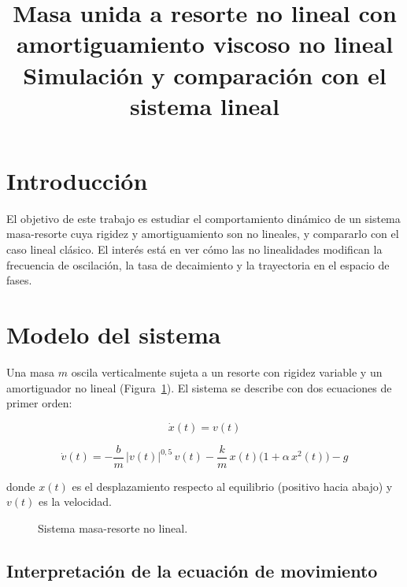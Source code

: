 \documentclass[12pt, a4paper]{article}
\title{
    \Large \textbf{Masa unida a resorte no lineal con amortiguamiento viscoso no lineal} \\[0.5cm]
    \large Simulación y comparación con el sistema lineal
}
\author{}
\date{}
\begin{document}
\maketitle
\tableofcontents
\newpage

\section{Introducción}

El objetivo de este trabajo es estudiar el comportamiento dinámico de un sistema masa-resorte cuya rigidez y amortiguamiento son no lineales, y compararlo con el caso lineal clásico. El interés está en ver cómo las no linealidades modifican la frecuencia de oscilación, la tasa de decaimiento y la trayectoria en el espacio de fases.

\section{Modelo del sistema}

Una masa $m$ oscila verticalmente sujeta a un resorte con rigidez variable y un amortiguador no lineal (Figura~\ref{fig:sistema}). El sistema se describe con dos ecuaciones de primer orden:

\begin{equation}
    \dot{x}(t) = v(t)
\end{equation}

\begin{equation}
    \dot{v}(t) = -\frac{b}{m}\,|v(t)|^{0{,}5}\,v(t)
                 - \frac{k}{m}\,x(t)\bigl(1 + \alpha\,x^2(t)\bigr) - g
    \label{eq:vdot}
\end{equation}

donde $x(t)$ es el desplazamiento respecto al equilibrio (positivo hacia abajo) y $v(t)$ es la velocidad.

\begin{figure}[H]
    \centering
    \fbox{\rule{0pt}{4cm}\rule{5cm}{0pt}}
    \caption{Sistema masa-resorte no lineal.}
    \label{fig:sistema}
\end{figure}

\subsection{Interpretación de la ecuación de movimiento}
\end{document}

